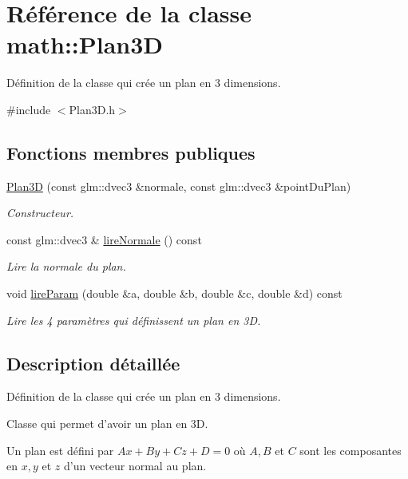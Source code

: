 \hypertarget{classmath_1_1_plan3_d}{\section{Référence de la classe math\-:\-:Plan3\-D}
\label{classmath_1_1_plan3_d}
}


Définition de la classe qui crée un plan en 3 dimensions.  




{\ttfamily \#include $<$Plan3\-D.\-h$>$}

\subsection*{Fonctions membres publiques}
\begin{DoxyCompactItemize}
\item 
\hyperlink{classmath_1_1_plan3_d_af74f4c3852d6a0763fdce91be58ddda2}{Plan3\-D} (const glm\-::dvec3 \&normale, const glm\-::dvec3 \&point\-Du\-Plan)
\begin{DoxyCompactList}\small\item\em Constructeur. \end{DoxyCompactList}\item 
const glm\-::dvec3 \& \hyperlink{classmath_1_1_plan3_d_a359b996e0c4bb4b07b44debc1cdeb77e}{lire\-Normale} () const 
\begin{DoxyCompactList}\small\item\em Lire la normale du plan. \end{DoxyCompactList}\item 
void \hyperlink{classmath_1_1_plan3_d_a0246c57422ec6bcd5cffe0935e734819}{lire\-Param} (double \&a, double \&b, double \&c, double \&d) const 
\begin{DoxyCompactList}\small\item\em Lire les 4 paramètres qui définissent un plan en 3\-D. \end{DoxyCompactList}\end{DoxyCompactItemize}


\subsection{Description détaillée}
Définition de la classe qui crée un plan en 3 dimensions. 

Classe qui permet d'avoir un plan en 3\-D.\par
Un plan est défini par $ Ax + By + Cz + D = 0 $ où $ A, B $ et $ C $ sont les composantes en $ x, y $ et $ z $ d'un vecteur normal au plan.

